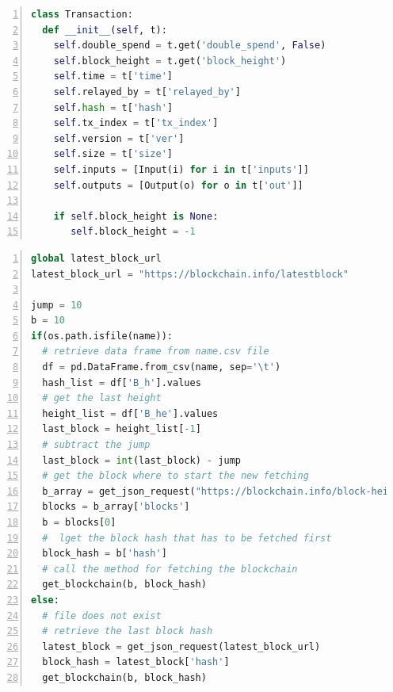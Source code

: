 \documentclass[USenglish]{uit-thesis}
\begin{document}
\begin{appendices}
\begin{lstlisting}[float, numbers=left,frame=single,caption={Transaction object structure obtained using Bitcoin's \gls{api}s.},language=Python]
class Transaction:
  def __init__(self, t):
    self.double_spend = t.get('double_spend', False)
    self.block_height = t.get('block_height')
    self.time = t['time']
    self.relayed_by = t['relayed_by']
    self.hash = t['hash']
    self.tx_index = t['tx_index']
    self.version = t['ver']
    self.size = t['size']
    self.inputs = [Input(i) for i in t['inputs']]
    self.outputs = [Output(o) for o in t['out']]

    if self.block_height is None:
       self.block_height = -1
\end{lstlisting}




\begin{lstlisting}[float, numbers=left,frame=single,caption={Portion retrieval having a jump $J = 10$ and a number of blocks retrieved per time $b = 10$.},language=Python]
global latest_block_url
latest_block_url = "https://blockchain.info/latestblock"

jump = 10
b = 10
if(os.path.isfile(name)):
  # retrieve data frame from name.csv file
  df = pd.DataFrame.from_csv(name, sep='\t')
  hash_list = df['B_h'].values
  # get the last height
  height_list = df['B_he'].values
  last_block = height_list[-1]
  # subtract the jump
  last_block = int(last_block) - jump
  # get the block where to start the new fetching
  b_array = get_json_request("https://blockchain.info/block-height/" + str(last_block) + "?format=json")
  blocks = b_array['blocks']
  b = blocks[0]
  #  lget the block hash that has to be fetched first
  block_hash = b['hash']
  # call the method for fetching the blockchain
  get_blockchain(b, block_hash)
else:
  # file does not exist
  # retrieve the last block hash
  latest_block = get_json_request(latest_block_url)
  block_hash = latest_block['hash']
  get_blockchain(b, block_hash)

\end{lstlisting}





\end{appendices}
\end{document}
